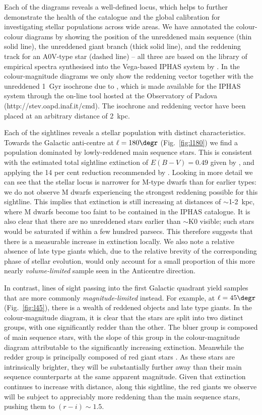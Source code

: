 \documentclass[a4paper,useAMS,usenatbib]{mn2e}
\begin{document}
Each of the diagrams reveals a well-defined locus,
which helps to further demonstrate the health of the catalogue
and the global calibration
for investigating stellar populations across wide areas.
We have annotated the colour-colour diagrams
by showing the position 
of the unreddened main sequence (thin solid line),
the unreddened giant branch (thick solid line),
and the reddening track for an A0V-type star (dashed line)
-- all three are based on the \cite{Pickles1998} library 
of empirical spectra
synthesised into the Vega-based IPHAS system by \cite{Drew2005}.
In the colour-magnitude diagrams we only show the reddening vector
together with the unreddened 1~Gyr isochrone due to \cite{Bressan2012},
which is made available for the IPHAS system through the
on-line tool hosted at the Observatory of Padova
(http://stev.oapd.inaf.it/cmd).
The isochrone and reddening vector have been placed
at an arbitrary distance of 2~kpc.

Each of the sightlines reveals a stellar population
with distinct characteristics.
Towards the Galactic anti-centre 
at $\ell=180\degr$ (Fig.~\ref{fig:l180})
we find a population dominated by lowly-reddened main sequence stars.
This is consistent with the estimated total sightline extinction 
of $E(B-V)=0.49$ given by \cite{Schlegel1998},
and applying the 14 per cent reduction recommended by \cite{Schlafly2011}.
Looking in more detail we can see
that the stellar locus is narrower for M-type dwarfs
than for earlier types:
we do not observe M dwarfs experiencing 
the strongest reddening possible for this sightline.
This implies that extinction is still increasing 
at distances of $\sim$1-2~kpc,
where M dwarfs become too faint to be contained in the IPHAS catalogue.
It is also clear that there are no unreddened stars
earlier than $\sim$K0 visible;
such stars would be saturated if within a few hundred parsecs.
This therefore suggests 
that there is a measurable increase in extinction locally.
We also note a relative absence of late type giants which,
due to the relative brevity 
of the corresponding phase of stellar evolution,
would only account for a small proportion of this more nearly \emph{volume-limited} sample seen in the Anticentre direction.
 
In contrast, lines of sight passing into the first Galactic quadrant
yield samples that are more commonly \emph{magnitude-limited} instead.
For example, at $\ell=45\degr$ (Fig.~\ref{fig:l45}),
there is  a wealth of reddened objects and late type giants.
In the colour-magnitude diagram, it is clear
that the stars are split into two distinct groups,
with one significantly redder than the other.
The bluer group is composed of main sequence stars,
with the slope of this group in the colour-magnitude diagram
attributable to the significantly increasing extinction.
Meanwhile the redder group is principally composed of red giant stars \citep[see][]{Wright2008}.
As these stars are intrinsically brighter, they will be substantially 
further away than their main sequence counterparts at the same 
apparent magnitude.  Given that extinction continues to increase 
with distance, along this sightline, 
the red giants we observe will be subject to appreciably more reddening
than the main sequence stars, pushing them to $(r - i) \sim 1.5$.
\end{document}
